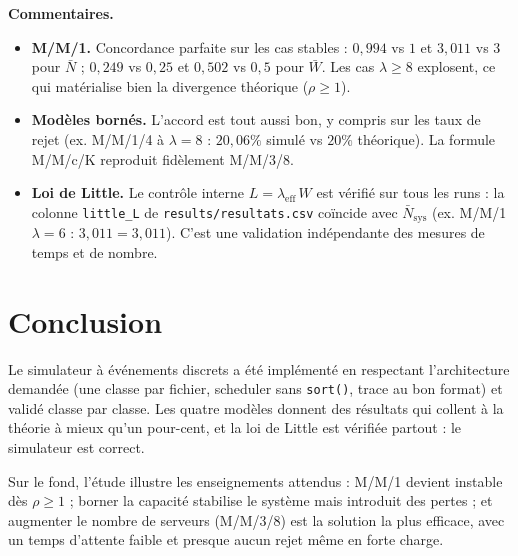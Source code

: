 \documentclass[11pt,a4paper]{article}
\begin{document}
\noindent\textbf{Commentaires.}
\begin{itemize}
  \item \textbf{M/M/1.} Concordance parfaite sur les cas stables : $0{,}994$ vs $1$ et
        $3{,}011$ vs $3$ pour $\bar N$ ; $0{,}249$ vs $0{,}25$ et $0{,}502$ vs $0{,}5$ pour
        $\bar W$. Les cas $\lambda\ge8$ \og explosent\fg{}, ce qui matérialise bien la
        divergence théorique ($\rho\ge1$).
  \item \textbf{Modèles bornés.} L'accord est tout aussi bon, y compris sur les
        taux de rejet (ex. M/M/1/4 à $\lambda=8$ : $20{,}06\%$ simulé vs $20\%$
        théorique). La formule M/M/c/K reproduit fidèlement M/M/3/8.
  \item \textbf{Loi de Little.} Le contrôle interne $L=\lambda_{\text{eff}}\,W$ est
        vérifié sur tous les runs : la colonne \texttt{little\_L} de
        \texttt{results/resultats.csv} coïncide avec $\bar N_{\text{sys}}$ (ex. M/M/1
        $\lambda=6$ : $3{,}011=3{,}011$). C'est une validation indépendante des
        mesures de temps et de nombre.
\end{itemize}

\section{Conclusion}
Le simulateur à événements discrets a été implémenté en respectant
l'architecture demandée (une classe par fichier, scheduler sans \texttt{sort()},
trace au bon format) et validé classe par classe. Les quatre modèles donnent des
résultats qui collent à la théorie à mieux qu'un pour-cent, et la loi de Little
est vérifiée partout : le simulateur est correct.

Sur le fond, l'étude illustre les enseignements attendus : M/M/1 devient instable
dès $\rho\ge1$ ; borner la capacité stabilise le système mais introduit des
pertes ; et augmenter le nombre de serveurs (M/M/3/8) est la solution la plus
efficace, avec un temps d'attente faible et presque aucun rejet même en forte
charge.
\end{document}
